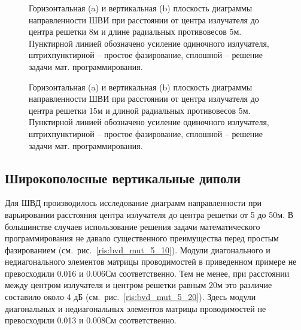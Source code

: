\begin{figure}
\begin{minipage}[h]{0.49\linewidth}
\end{minipage}
\hfill
\begin{minipage}[h]{0.49\linewidth}
\end{minipage}
\caption{Горизонтальная (a) и вертикальная (b) плоскость диаграммы направленности ШВИ при расстоянии от центра излучателя до центра решетки 8м и длине радиальных противовесов 5м. Пунктирной линией обозначено усиление одиночного излучателя, штрихпунктирной -- простое фазирование, сплошной -- решение задачи мат. программирования.}
\label{ris:bve_mut_5_8}
\end{figure}

\begin{figure}
\begin{minipage}[h]{0.49\linewidth}
\end{minipage}
\hfill
\begin{minipage}[h]{0.49\linewidth}
\end{minipage}
\caption{Горизонтальная (a) и вертикальная (b) плоскость диаграммы направленности ШВИ при расстоянии от центра излучателя до центра решетки 15м и длиной радиальных противовесов 5м. Пунктирной линией обозначено усиление одиночного излучателя, штрихпунктирной -- простое фазирование, сплошной -- решение задачи мат. программирования.}
\label{ris:bve_mut_5_15}
\end{figure}

\subsection{Широкополосные вертикальные диполи}

Для ШВД производилось исследование диаграмм направленности при варьировании расстояния центра излучателя до центра решетки от 5 до 50м. В большинстве случаев использование решения задачи математического программирования не давало существенного преимущества перед простым фазированием (см.~рис.~\ref{ris:bvd_mut_5_10}). Модули диагонального и недиагонального элементов матрицы проводимостей в приведенном примере не превосходили 0.016 и 0.006См соответственно.  Тем не менее, при расстоянии между центром излучателя и центром решетки равным 20м это различие составило около 4 дБ (см.~рис.~\ref{ris:bvd_mut_5_20}). Здесь модули диагональных и недиагональных элементов матрицы проводимостей не превосходили 0.013 и 0.008См соответственно.

